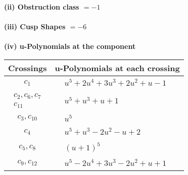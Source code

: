 \documentclass[1p]{elsarticle_modified}
\theoremstyle{definition}
\begin{document}
\flushleft \textbf{(ii) Obstruction class $= -1$}\\~\\
\flushleft \textbf{(iii) Cusp Shapes $= -6$}\\~\\
\newpage\renewcommand{\arraystretch}{1}
\flushleft \textbf{(iv) u-Polynomials at the component}\newline \\
\begin{tabular}{m{50pt}|m{274pt}}
Crossings & \hspace{64pt}u-Polynomials at each crossing \\
\hline $$\begin{aligned}c_{1}\end{aligned}$$&$\begin{aligned}
&u^5+2 u^4+3 u^3+2 u^2+u-1
\end{aligned}$\\
\hline $$\begin{aligned}c_{2},c_{6},c_{7}\\c_{11}\end{aligned}$$&$\begin{aligned}
&u^5+u^3+u+1
\end{aligned}$\\
\hline $$\begin{aligned}c_{3},c_{10}\end{aligned}$$&$\begin{aligned}
&u^5
\end{aligned}$\\
\hline $$\begin{aligned}c_{4}\end{aligned}$$&$\begin{aligned}
&u^5+u^3-2 u^2- u+2
\end{aligned}$\\
\hline $$\begin{aligned}c_{5},c_{8}\end{aligned}$$&$\begin{aligned}
&(u+1)^5
\end{aligned}$\\
\hline $$\begin{aligned}c_{9},c_{12}\end{aligned}$$&$\begin{aligned}
&u^5-2 u^4+3 u^3-2 u^2+u+1
\end{aligned}$\\
\hline
\end{tabular}\\~\\
\end{document}
